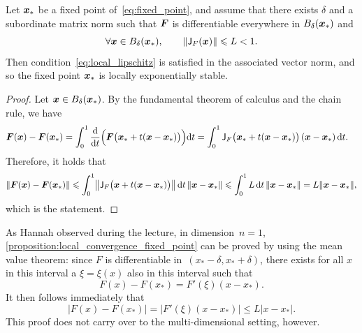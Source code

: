 \begin{proposition}
    \label{proposition:local_convergence_fixed_point}
    Let $\mathbf{\boldsymbol{x}}_*$ be a fixed point of~\eqref{eq:fixed_point},
    and assume that there exists $\delta$ and a subordinate matrix norm such that
    $\mathbf{\boldsymbol{F}}$ is differentiable everywhere in $B_{\delta}(\mathbf{\boldsymbol{x}}_*)$ and
    \[
        \forall \mathbf{\boldsymbol{x}} \in B_{\delta}(\mathbf{\boldsymbol{x}}_*), \qquad
        \lVert\mathsf J_F(\mathbf{\boldsymbol{x}})\rVert \leqslant L < 1.
    \]
    Then condition~\eqref{eq:local_lipschitz} is satisfied in the associated vector norm,
    and so the fixed point $\mathbf{\boldsymbol{x}}_*$ is locally exponentially stable.
\end{proposition}
\begin{proof}
    Let $\mathbf{\boldsymbol{x}} \in B_{\delta}(\mathbf{\boldsymbol{x}}_*)$.
    By the fundamental theorem of calculus and the chain rule,
    we have
    \begin{align*}
        \mathbf{\boldsymbol{F}}(\mathbf{\boldsymbol{x}}) - \mathbf{\boldsymbol{F}}(\mathbf{\boldsymbol{x}}_*)
        &= \int_{0}^{1} \frac{\mathrm d}{\mathrm d t} \Bigl( \mathbf{\boldsymbol{F}}\bigl(\mathbf{\boldsymbol{x}}_* + t(\mathbf{\boldsymbol{x}} - \mathbf{\boldsymbol{x}}_*) \bigr) \Bigr) \mathrm d t
        = \int_{0}^{1} \mathsf J_F\bigl(\mathbf{\boldsymbol{x}}_* + t(\mathbf{\boldsymbol{x}} - \mathbf{\boldsymbol{x}}_*)\bigr) \left(\mathbf{\boldsymbol{x}} - \mathbf{\boldsymbol{x}}_* \right) \mathrm d t.
    \end{align*}
    Therefore,
    it holds that
    \begin{align*}
        \norm{\vect F(\vect x) - \vect F(\vect x_*)}
        \leq \int_{0}^{1} \norm*{\mat J_F\bigl(\vect x + t(\vect x - \vect x_*)\bigr)}  \, \d t \, \norm{\vect x - \vect x_*}
        \leq \int_{0}^{1} L \, \d t \, \norm{\vect x - \vect x_*} = L \norm{\vect x - \vect x_*},
    \end{align*}
    which is the statement.
\end{proof}
\begin{remark}
    As Hannah observed during the lecture,
    in dimension~$n = 1$, \cref{proposition:local_convergence_fixed_point} can be proved by using the mean value theorem:
    since $F$ is differentiable in~$(x_* -\delta, x_* + \delta)$,
    there exists for all $x$ in this interval a $\xi = \xi(x)$ also in this interval such that
    \[
        F(x) - F(x_*) = F'(\xi) (x - x_*).
    \]
    It then follows immediately that
    \[
        \bigl\lvert F(x) - F(x_*) \bigr\rvert
        = \left\lvert F'(\xi) (x - x_*) \right\rvert
        \leq L \lvert x - x_* \rvert.
    \]
    This proof does not carry over to the multi-dimensional setting, however.
\end{remark}

